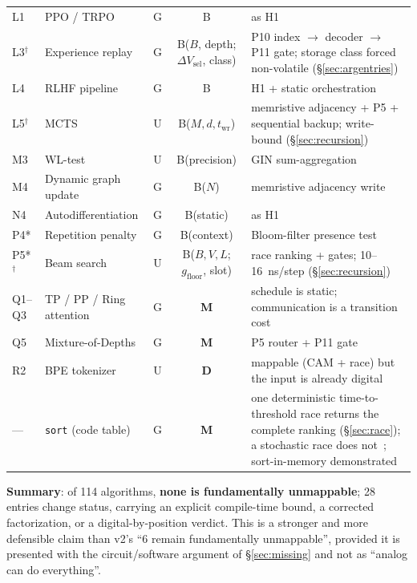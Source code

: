 \documentclass[11pt]{article}
\begin{document}
\begin{table}[t]
\begin{tabular}{llccp{6.2cm}}
L1 & PPO / TRPO & G & B & as H1 \\
L3$^\dagger$ & Experience replay & G & B($B$, depth; $\Delta V_{\mathrm{sel}}$, class) & P10 index $\to$ decoder $\to$ P11 gate; storage class forced non-volatile (\S\ref{sec:argentries}) \\
L4 & RLHF pipeline & G & B & H1 + static orchestration \\
L5$^\dagger$ & MCTS & U & B($M,d,t_{\mathrm{wr}}$) & memristive adjacency + P5 + sequential backup; write-bound (\S\ref{sec:recursion}) \\
M3 & WL-test & U & B(precision) & GIN sum-aggregation~\cite{xu2019gin} \\
M4 & Dynamic graph update & G & B($N$) & memristive adjacency write \\
N4 & Autodifferentiation & G & B(static) & as H1 \\
P4* & Repetition penalty & G & B(context) & Bloom-filter presence test~\cite{dasgupta2018} \\
P5*$^\dagger$ & Beam search & U & B($B,V,L$; $g_{\mathrm{floor}}$, slot) & race ranking + gates; 10--16~ns/step (\S\ref{sec:recursion}) \\
Q1--Q3 & TP / PP / Ring attention & G & \textbf{M} & schedule is static; communication is a transition cost \\
Q5 & Mixture-of-Depths & G & \textbf{M} & P5 router + P11 gate \\
R2 & BPE tokenizer & U & \textbf{D} & mappable (CAM + race) but the input is already digital \\
--- & \texttt{sort} (code table) & G & \textbf{M} & one deterministic time-to-threshold race returns the complete ranking (\S\ref{sec:race}); a stochastic race does not~\cite{bieg2026}; sort-in-memory demonstrated~\cite{yu2025sort} \\
\bottomrule
\end{tabular}
\end{table}

\textbf{Summary}: of 114 algorithms, \textbf{none is fundamentally unmappable}; 28 entries change status, carrying an explicit compile-time bound, a corrected factorization, or a digital-by-position verdict. This is a stronger and more defensible claim than v2's ``6 remain fundamentally unmappable'', provided it is presented with the circuit/software argument of \S\ref{sec:missing} and not as ``analog can do everything''.
\end{document}
